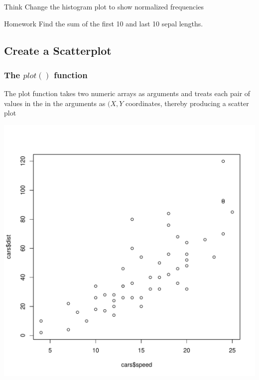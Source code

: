 \documentclass[12pt]{book}\usepackage{knitr}
\begin{document}
\begin{DIY}{Think}
Change the histogram plot to show normalized frequencies
\end{DIY}

\begin{DIY}{Homework}
Find the sum of the first 10 and last 10 sepal lengths.
\end{DIY}
\subsection{Create a Scatterplot}
\subsubsection{The $plot()$ function}
\noindent The plot function takes two numeric arrays as arguments and treats each pair of values in the in the arguments as $(X,Y$ coordinates, thereby producing a scatter plot 
\begin{knitrout}
\color{fgcolor}\begin{kframe}
\begin{alltt}
\hlopt{$}\hlopt{$} 
\end{alltt}
\end{kframe}
\includegraphics[width=\maxwidth]{figure/plot-1} 
\begin{kframe}\begin{alltt}
\end{alltt}
\end{kframe}
\end{knitrout}
\end{document}
